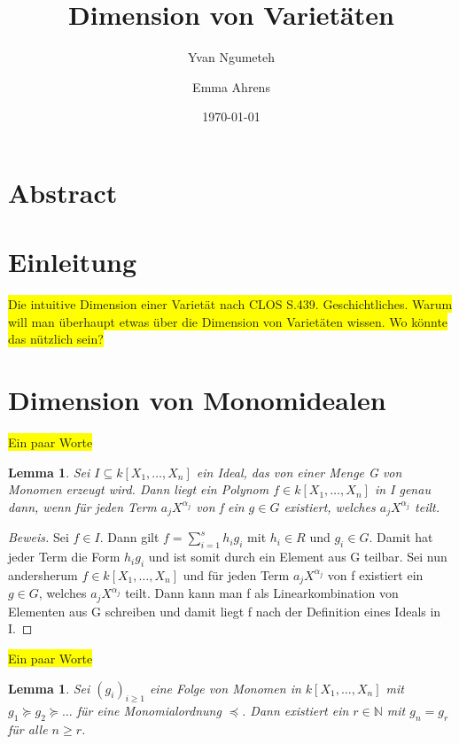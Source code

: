 \documentclass{article}
\title{Dimension von Varietäten}
\date{\today}
\author{Yvan Ngumeteh \and Emma Ahrens}
\newtheorem{lemma}[satz]{Lemma}
\newcommand*{\R}{k[X_{1},\ldots,X_{n}]}
\begin{document}
\maketitle
\tableofcontents

\section{Abstract}
\section{Einleitung}
	
	\colorbox{yellow}{Die intuitive Dimension einer Varietät nach CLOS S.439.
	Geschichtliches. Warum will man überhaupt etwas über die Dimension von Varietäten wissen.
	Wo könnte das nützlich sein?}

\section{Dimension von Monomidealen}
	
	\colorbox{yellow}{Ein paar Worte}

	\begin{lemma} \label{1.2.3}
	Sei \(I \subseteq \R\) ein Ideal, das von einer Menge G von Monomen erzeugt wird. Dann liegt
	ein Polynom \(f \in \R\) in I genau dann, wenn für jeden Term \(a_{j}X^{\alpha_{j}}\) von f ein
	\(g \in G\) existiert, welches \(a_{j}X^{\alpha_{j}}\) teilt.
	\end{lemma}

	\begin{proof}[Beweis]
	Sei \(f \in I\). Dann gilt \(f = \sum_{i=1}^{s} h_{i}g_{i}\) mit \(h_{i} \in R\) und \(g_{i}
	\in G\). Damit hat jeder Term die Form \(h_{i}g_{i}\) und ist somit durch ein Element aus G
	teilbar.
	Sei nun andersherum \(f \in \R\) und für jeden Term \(a_{j}X^{\alpha_{j}}\) von f existiert ein
	\(g \in G\), welches \(a_{j}X^{\alpha_{j}}\) teilt. Dann kann man f als Linearkombination von 
	Elementen aus G schreiben und damit liegt f nach der Definition eines Ideals in I.
	\end{proof}

	
	\colorbox{yellow}{Ein paar Worte}


	\begin{lemma} \label{1.2.4}
	Sei \((g_{i})_{i \geq 1}\) eine Folge von Monomen in \(\R\) mit \(g_{1} \succeq g_{2} \succeq
	\ldots\) für eine Monomialordnung \(\preceq\). Dann existiert ein \(r \in \mathbb{N}\) mit 
	\(g_{n} = g_{r}\) für alle \(n \geq r\). 
	\end{lemma}
\end{document}
